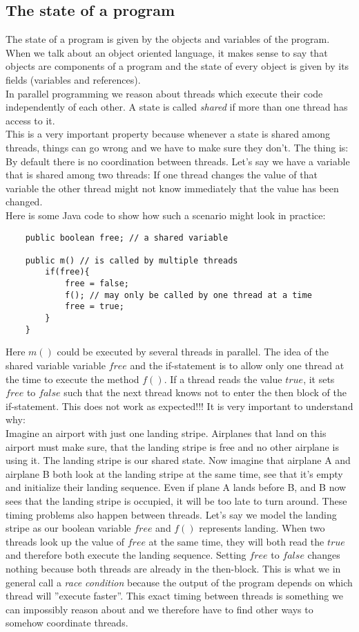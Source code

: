 \documentclass{scrreprt}
\begin{document}
\subsection{The state of a program}
The state of a program is given by the objects and variables of the program. When we talk about an object oriented language, it makes sense to say that objects are components of a program and the state of every object is given by its fields (variables and references).  \\
In parallel programming we reason about threads which execute their code independently of each other. A state is called \textit{shared} if more than one thread has access to it. \\
This is a very important property because whenever a state is shared among threads, things can go wrong and we have to make sure they don't. The thing is: By default there is no coordination between threads. Let's say we have a variable that is shared among two threads: If one thread changes the value of that variable the other thread might not know immediately that the value has been changed. \\
Here is some Java code to show how such a scenario might look in practice:
\lstset{language=Java}
\begin{lstlisting}
	public boolean free; // a shared variable

	public m() // is called by multiple threads
		if(free){
			free = false;
			f(); // may only be called by one thread at a time
			free = true;
		}
	}
\end{lstlisting}
Here $m()$ could be executed by several threads in parallel. The idea of the shared variable variable $free$ and the if-statement is to allow only one thread at the time to execute the method $f()$. If a thread reads the value $true$, it sets $free$ to $false$ such that the next thread knows not to enter the then block of the if-statement. This does not work as expected!!! It is very important to understand why: \\
Imagine an airport with just one landing stripe. Airplanes that land on this airport must make sure, that the landing stripe is free and no other airplane is using it. The landing stripe is our shared state. Now imagine that airplane A and airplane B both look at the landing stripe at the same time, see that it's empty and initialize their landing sequence. Even if plane A lands before B, and B now sees that the landing stripe is occupied, it will be too late to turn around. These timing problems also happen between threads. Let's say we model the landing stripe as our boolean variable $free$ and $f()$ represents landing. When two threads look up the value of $free$ at the same time, they will both read the $true$ and therefore both execute the landing sequence. Setting $free$ to $false$ changes nothing because both threads are already in the then-block. This is what we in general call a \textit{race condition} because the output of the program depends on which thread will ''execute faster''. This exact timing between threads is something we can impossibly reason about and we therefore	have to find other ways to somehow coordinate threads. \\
\end{document}
